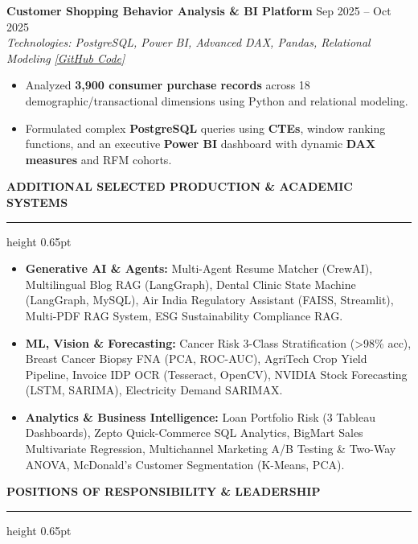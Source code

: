 \documentclass[10pt]{article}
\newcommand{\resumesection}[1]{%
  \vspace{4pt}%
  {\large \textbf{\uppercase{#1}}}%
  \vspace{1.5pt}%
  \hrule height 0.65pt%
  \vspace{3pt}%
}
\begin{document}
\vspace{1.5pt}

\textbf{Customer Shopping Behavior Analysis \& BI Platform} \hfill Sep 2025 -- Oct 2025\\
\textit{Technologies: PostgreSQL, Power BI, Advanced DAX, Pandas, Relational Modeling} \hfill \href{https://github.com/Ankitiitk369/Customer-Shoping-Behavior-Data-Analysis-Using-SQL-and-Power-BI}{\textit{[GitHub Code]}}
\begin{itemize}[noitemsep, topsep=1pt, partopsep=0pt, parsep=0.5pt]
    \item Analyzed \textbf{3,900 consumer purchase records} across 18 demographic/transactional dimensions using Python and relational modeling.
    \item Formulated complex \textbf{PostgreSQL} queries using \textbf{CTEs}, window ranking functions, and an executive \textbf{Power BI} dashboard with dynamic \textbf{DAX measures} and RFM cohorts.
\end{itemize}

\resumesection{Additional Selected Production \& Academic Systems}

\begin{itemize}[noitemsep, topsep=1pt, partopsep=0pt, parsep=0.5pt]
    \item \textbf{Generative AI \& Agents:} Multi-Agent Resume Matcher (CrewAI), Multilingual Blog RAG (LangGraph), Dental Clinic State Machine (LangGraph, MySQL), Air India Regulatory Assistant (FAISS, Streamlit), Multi-PDF RAG System, ESG Sustainability Compliance RAG.
    \item \textbf{ML, Vision \& Forecasting:} Cancer Risk 3-Class Stratification (>98\% acc), Breast Cancer Biopsy FNA (PCA, ROC-AUC), AgriTech Crop Yield Pipeline, Invoice IDP OCR (Tesseract, OpenCV), NVIDIA Stock Forecasting (LSTM, SARIMA), Electricity Demand SARIMAX.
    \item \textbf{Analytics \& Business Intelligence:} Loan Portfolio Risk (3 Tableau Dashboards), Zepto Quick-Commerce SQL Analytics, BigMart Sales Multivariate Regression, Multichannel Marketing A/B Testing \& Two-Way ANOVA, McDonald's Customer Segmentation (K-Means, PCA).
\end{itemize}

\resumesection{Positions of Responsibility \& Leadership}
\end{document}
